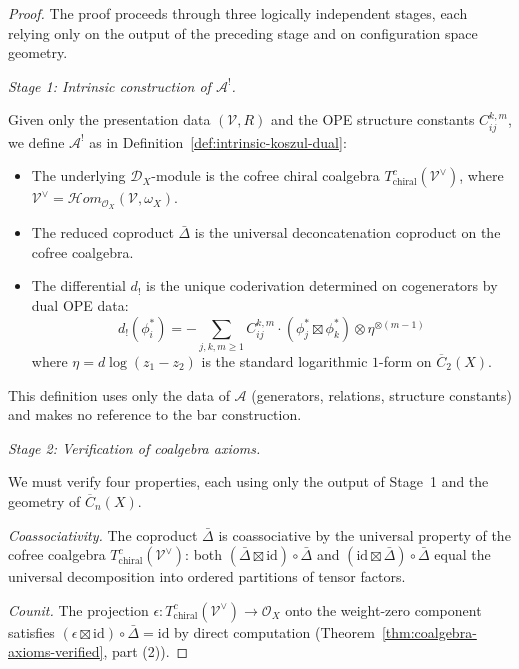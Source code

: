 \begin{proof}
The proof proceeds through three logically independent stages, each relying only on the output of the preceding stage and on configuration space geometry.

\medskip
\noindent\emph{Stage 1: Intrinsic construction of $\mathcal{A}^!$.}

Given only the presentation data $(\mathcal{V}, R)$ and the OPE structure constants $C_{ij}^{k,m}$, we define $\mathcal{A}^!$ as in Definition~\ref{def:intrinsic-koszul-dual}:
\begin{itemize}
\item The underlying $\mathcal{D}_X$-module is the cofree
  chiral coalgebra
  $T^c_{\mathrm{chiral}}\allowbreak(\mathcal{V}^{\vee})$,
  where
  $\mathcal{V}^{\vee}
  = \mathcal{H}\!om_{\mathcal{O}_X}\allowbreak(\mathcal{V},
  \omega_X)$.
\item The reduced coproduct $\bar\Delta$ is the universal
  deconcatenation coproduct on the cofree coalgebra.
\item The differential $d_!$ is the unique coderivation determined on cogenerators by dual OPE data:
\[d_!(\phi_i^*) = -\sum_{j,k,m \geq 1} C_{ij}^{k,m} \cdot (\phi_j^* \boxtimes \phi_k^*) \otimes \eta^{\otimes(m-1)}\]
where $\eta = d\log(z_1 - z_2)$ is the standard logarithmic $1$-form on $\overline{C}_2(X)$.
\end{itemize}
This definition uses only the data of $\mathcal{A}$ (generators, relations, structure constants) and makes no reference to the bar construction.

\medskip
\noindent\emph{Stage 2: Verification of coalgebra axioms.}

We must verify four properties, each using only the output of Stage~1 and the geometry of $\overline{C}_n(X)$.

\emph{Coassociativity.}  The coproduct $\bar\Delta$ is coassociative by the universal property of the cofree coalgebra $T^c_{\mathrm{chiral}}(\mathcal{V}^{\vee})$: both $(\bar\Delta \boxtimes \mathrm{id}) \circ \bar\Delta$ and $(\mathrm{id} \boxtimes \bar\Delta) \circ \bar\Delta$ equal the universal decomposition into ordered partitions of tensor factors.

\emph{Counit.}  The projection $\epsilon \colon T^c_{\mathrm{chiral}}(\mathcal{V}^{\vee}) \to \mathcal{O}_X$ onto the weight-zero component satisfies $(\epsilon \boxtimes \mathrm{id}) \circ \bar\Delta = \mathrm{id}$ by direct computation (Theorem~\ref{thm:coalgebra-axioms-verified}, part (2)).


\end{proof}
